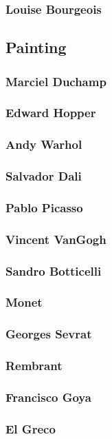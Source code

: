 			\subsubsection{Louise Bourgeois}
			
		\subsection{Painting}
			\subsubsection{Marciel Duchamp}
			\subsubsection{Edward Hopper}
			\subsubsection{Andy Warhol}
			\subsubsection{Salvador Dali}
			\subsubsection{Pablo Picasso}
			\subsubsection{Vincent VanGogh}
			\subsubsection{Sandro Botticelli}
			\subsubsection{Monet}
			\subsubsection{Georges Sevrat}
			\subsubsection{Rembrant}
			\subsubsection{Francisco Goya}
			\subsubsection{El Greco}
